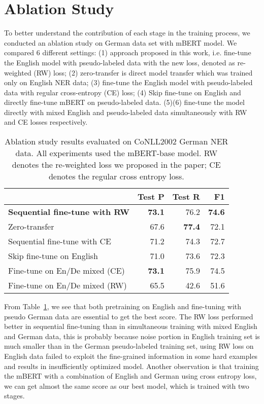 \documentclass[11pt]{article}
\begin{document}
\section{Ablation Study}
\label{section:ablation}
To better understand the contribution of each stage in the training process, we conducted an ablation study on German data set with mBERT model. We compared 6 different settings: (1) approach proposed in this work, i.e. fine-tune the English model with pseudo-labeled data with the new loss, denoted as re-weighted (RW) loss; (2) zero-transfer is direct model transfer which was trained only on English NER data; (3) fine-tune the English model with pseudo-labeled data with regular cross-entropy (CE) loss; (4) Skip fine-tune on English and directly fine-tune mBERT on pseudo-labeled data. (5)(6) fine-tune the model directly with mixed English and pseudo-labeled data simultaneously with RW and CE losses respectively.

\begin{table}[t]
	\small
	\begin{center}
		\begin{tabular}{lrrr}
			\toprule
			& \textbf{Test P} & \textbf{Test R} & \textbf{F1}\\
			\hline
			\textbf{Sequential fine-tune with RW} & \textbf{73.1} &  76.2 & \textbf{74.6}    \\
			Zero-transfer & 67.6 & \textbf{77.4} & 72.1   \\
			Sequential fine-tune with CE  & 71.2 & 74.3 & 72.7 \\
			Skip fine-tune on English & 71.0 & 73.6 & 72.3 \\
			Fine-tune on En/De mixed (CE) & \textbf{73.1} & 75.9 & 74.5 \\
			Fine-tune on En/De mixed (RW) & 65.5 & 42.6 & 51.6 \\
			\toprule
		\end{tabular}
	\end{center}
	\caption{Ablation study results evaluated on CoNLL2002 German NER data. All experiments used the mBERT-base model. RW denotes the re-weighted loss we proposed in the paper; CE denotes the regular cross entropy loss.}
	\label{tab:ablation}
\end{table}

From Table~\ref{tab:ablation}, we see that both pretraining on English and fine-tuning with pseudo German data are essential to get the best score. The RW loss performed better in sequential fine-tuning than in simultaneous training with mixed English and German data, this is probably because noise portion in English training set is much smaller than in the German pseudo-labeled training set, using RW loss on English data failed to exploit the fine-grained information in some hard examples and results in insufficiently optimized model. Another observation is that training the mBERT with a combination of English and German using cross entropy loss, we can get almost the same score as our best model, which is trained with two stages.
\end{document}

